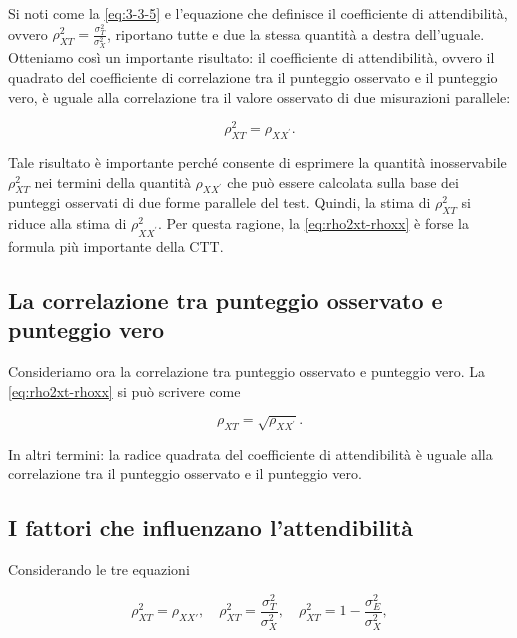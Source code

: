 \documentclass[
  11pt,
]{krantz}
\theoremstyle{definition}
\theoremstyle{definition}
\theoremstyle{definition}
\theoremstyle{definition}
\theoremstyle{remark}
\begin{document}
Si noti come la \eqref{eq:3-3-5} e l'equazione che definisce il coefficiente di attendibilità, ovvero \(\rho_{XT}^2 = \frac{\sigma_{T}^2}{\sigma_X^2}\), riportano tutte e due la stessa quantità a destra dell'uguale. Otteniamo così un importante risultato: il coefficiente di attendibilità, ovvero il quadrato del coefficiente di correlazione tra il punteggio osservato e il punteggio vero, è uguale alla correlazione tra il valore osservato di due misurazioni parallele:

\begin{equation}
\rho^2_{XT} =  \rho_{XX^\prime}.
\label{eq:rho2xt-rhoxx}
\end{equation}

Tale risultato è importante perché consente di esprimere la quantità inosservabile \(\rho^2_{XT}\) nei termini della quantità \(\rho_{XX^\prime}\) che può essere calcolata sulla base dei punteggi osservati di due forme parallele del test. Quindi, la stima di \(\rho^2_{XT}\) si riduce alla stima di \(\rho^2_{XX^\prime}\). Per questa ragione, la \eqref{eq:rho2xt-rhoxx} è forse la formula più importante della CTT.

\hypertarget{la-correlazione-tra-punteggio-osservato-e-punteggio-vero}{%
\subsection{La correlazione tra punteggio osservato e punteggio vero}\label{la-correlazione-tra-punteggio-osservato-e-punteggio-vero}}

Consideriamo ora la correlazione tra punteggio osservato e punteggio vero. La \eqref{eq:rho2xt-rhoxx} si può scrivere come

\[
\rho_{XT} = \sqrt{\rho_{XX^\prime}}.
\]

In altri termini: la radice quadrata del coefficiente di attendibilità è uguale alla correlazione tra il punteggio osservato e il punteggio vero.

\hypertarget{i-fattori-che-influenzano-lattendibilituxe0}{%
\subsection{I fattori che influenzano l'attendibilità}\label{i-fattori-che-influenzano-lattendibilituxe0}}

Considerando le tre equazioni

\[
\rho^2_{XT} = \rho_{XX'},\quad
\rho_{XT}^2 = \frac{\sigma_{T}^2}{\sigma_X^2}, \quad
\rho_{XT}^2 = 1-\frac{\sigma_{E}^2}{\sigma_X^2},
\]
\end{document}
